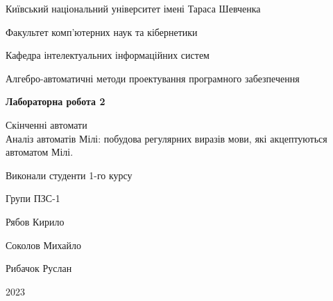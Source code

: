 \documentclass[12pt,a4paper]{article}
\begin{document}
\begin{titlepage}
    \centering
    \vspace*{1cm}

    \Large
    Київський національний університет імені Тараса Шевченка \\

    \vspace{0.5cm}

    \large
    Факультет комп'ютерних наук та кібернетики \\

    \vspace{0.5cm}

    Кафедра інтелектуальних інформаційних систем \\

    \vspace{0.5cm}

    Алгебро-автоматичні методи проектування програмного забезпечення \\

    \vspace{3cm}

    \textbf{Лабораторна робота 2} \\

    \vspace{0.5cm}

    Скінченні автомати \\
    Аналіз автоматів Мілі: побудова регулярних виразів мови, які акцептуються автоматом Мілі. \\

    \vspace{2cm}

    Виконали студенти 1-го курсу \\

    \vspace{0.2cm}

    Групи ПЗС-1 \\

    \vspace{0.1cm}

    Рябов Кирило \\

    \vspace{0.1cm}

    Соколов Михайло \\

    \vspace{0.1cm}

    Рибачок Руслан \\

    \vfill

    2023

\end{titlepage}
\end{document}
